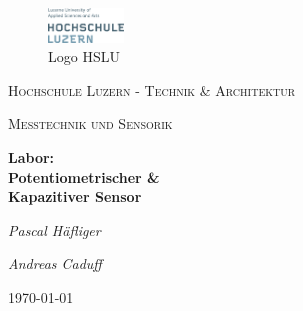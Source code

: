 
\begin{titlepage}
	\centering
	
	\begin{figure}[H]
        \centering
        \includegraphics[width=0.18\textwidth]{pic/logo.png}


        
        \captionsetup{textformat=empty,labelformat=empty} %
        \caption{Logo HSLU}
    \end{figure}

	
	
	\par\vspace{1cm}
	{\scshape\LARGE Hochschule Luzern - Technik \& Architektur\par}
	\vspace{1cm}
	{\scshape\Large Messtechnik und Sensorik\par}
	\vspace{1.5cm}
	{\huge\bfseries Labor: \\ Potentiometrischer \& \\ Kapazitiver Sensor\par}
	\vspace{2cm}
	{\Large\itshape Pascal Häfliger\par}
	{\Large\itshape Andreas Caduff\par}
	\vfill
	\vspace{1cm}
	
	

	\vfill  %

	{\large \today\par}
\end{titlepage}



\clearpage